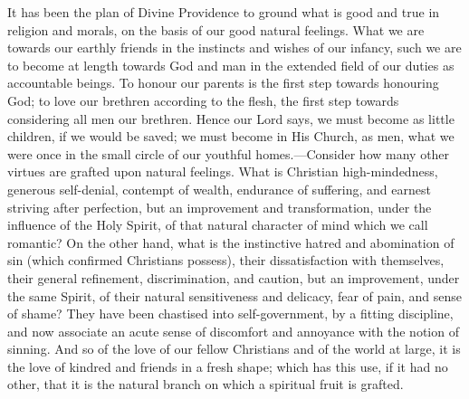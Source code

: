 It has been the plan of Divine Providence to ground what is good
and true in religion and morals, on the basis of our good natural
feelings. What we are towards our earthly friends in the instincts and
wishes of our infancy, such we are to become at length towards God and
man in the extended field of our duties as accountable beings. To
honour our parents is the first step towards honouring God; to love
our brethren according to the flesh, the first step towards
considering all men our brethren. Hence our Lord says, we must become
as little children, if we would be saved; we must become in His
Church, as men, what we were once in the small circle of our youthful
homes.—Consider how many other virtues are grafted upon natural
feelings. What is Christian high-mindedness, generous self-denial,
contempt of wealth, endurance of suffering, and earnest striving after
perfection, but an improvement and transformation, under the influence
of the Holy Spirit, of that natural character of mind which we call
romantic? On the other hand, what is the instinctive hatred and
abomination of sin (which confirmed Christians possess), their
dissatisfaction with themselves, their general refinement,
discrimination, and caution, but an improvement, under the same
Spirit, of their natural sensitiveness and delicacy, fear of pain, and
sense of shame? They have been chastised into self-government, by a
fitting discipline, and now associate an acute sense of discomfort and
annoyance with the notion of sinning. And so of the love of our fellow
Christians and of the world at large, it is the love of kindred and
friends in a fresh shape; which has this use, if it had no other, that
it is the natural branch on which a spiritual fruit is grafted.

